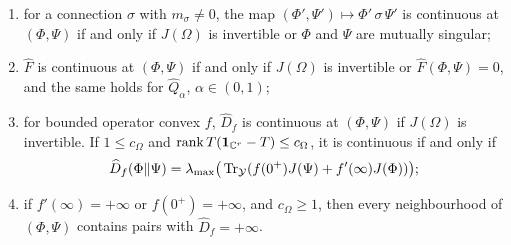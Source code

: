 \begin{theorem}
\begin{enumerate}
\begin{enumerate}
\item[(i)] for a connection $\sigma$ with $m_\sigma\neq0$, the map $(\Phi',\Psi')\mapsto\Phi'\,\sigma\,\Psi'$ is continuous at $(\Phi,\Psi)$ if and only if $J(\Omega)$ is invertible or $\Phi$ and $\Psi$ are mutually singular;
\item[(ii)] $\widehat F$ is continuous at $(\Phi,\Psi)$ if and only if $J(\Omega)$ is invertible or $\widehat F(\Phi,\Psi)=0$, and the same holds for $\widehat Q_\alpha$, $\alpha\in(0,1)$;
\item[(iii)] for bounded operator convex $f$, $\widehat D_f$ is continuous at $(\Phi,\Psi)$ if $J(\Omega)$ is invertible. If $1\leq c_\Omega$ and $\operatorname{rank} T(\mathbf{1}_{\mathbb{C}^r}-T)\leq c_\Omega$, it is continuous if and only if
\[
\widehat D_f(\Phi\|\Psi)=\lambda_{\max}\big(\operatorname{Tr}_{\mathcal{Y}}(f(0^+)J(\Psi)+f'(\infty)J(\Phi))\big);
\]
\item[(iv)] if $f'(\infty)=+\infty$ or $f(0^+)=+\infty$, and $c_\Omega\geq1$, then every neighbourhood of $(\Phi,\Psi)$ contains pairs with $\widehat D_f=+\infty$.
\end{enumerate}
\end{enumerate}
\end{theorem}

